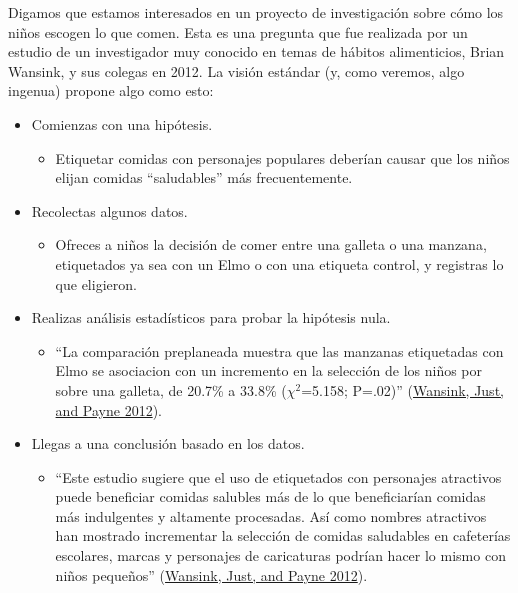 \documentclass[
  12pt,
]{book}
\providecommand{\tightlist}{%
  \setlength{\itemsep}{0pt}\setlength{\parskip}{0pt}}
\theoremstyle{definition}
\theoremstyle{definition}
\theoremstyle{definition}
\theoremstyle{remark}
\begin{document}
Digamos que estamos interesados en un proyecto de investigación sobre cómo los niños escogen lo que comen. Esta es una pregunta que fue realizada por un estudio de un investigador muy conocido en temas de hábitos alimenticios, Brian Wansink, y sus colegas en 2012. La visión estándar (y, como veremos, algo ingenua) propone algo como esto:

\begin{itemize}
\tightlist
\item
  Comienzas con una hipótesis.

  \begin{itemize}
  \tightlist
  \item
    Etiquetar comidas con personajes populares deberían causar que los niños elijan comidas ``saludables'' más frecuentemente.
  \end{itemize}
\item
  Recolectas algunos datos.

  \begin{itemize}
  \tightlist
  \item
    Ofreces a niños la decisión de comer entre una galleta o una manzana, etiquetados ya sea con un Elmo o con una etiqueta control, y registras lo que eligieron.
  \end{itemize}
\item
  Realizas análisis estadísticos para probar la hipótesis nula.

  \begin{itemize}
  \tightlist
  \item
    ``La comparación preplaneada muestra que las manzanas etiquetadas con Elmo se asociacion con un incremento en la selección de los niños por sobre una galleta, de 20.7\% a 33.8\% (\(\chi^2\)=5.158; P=.02)'' (\protect\hyperlink{ref-wans:just:payn:2012}{Wansink, Just, and Payne 2012}).
  \end{itemize}
\item
  Llegas a una conclusión basado en los datos.

  \begin{itemize}
  \tightlist
  \item
    ``Este estudio sugiere que el uso de etiquetados con personajes atractivos puede beneficiar comidas salubles más de lo que beneficiarían comidas más indulgentes y altamente procesadas. Así como nombres atractivos han mostrado incrementar la selección de comidas saludables en cafeterías escolares, marcas y personajes de caricaturas podrían hacer lo mismo con niños pequeños'' (\protect\hyperlink{ref-wans:just:payn:2012}{Wansink, Just, and Payne 2012}).
  \end{itemize}
\end{itemize}
\end{document}
